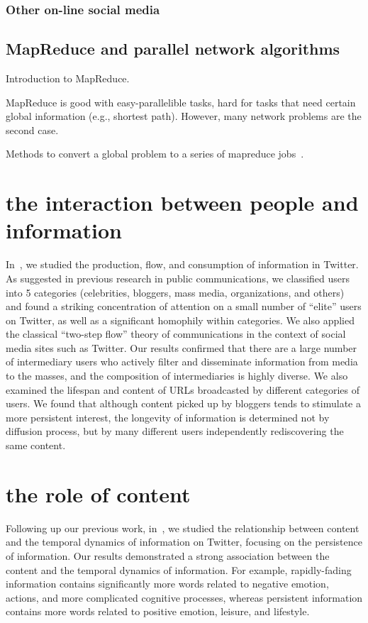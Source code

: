 \documentclass[phd,tocprelim]{cornell}
\begin{document}
\subsection{Other on-line social media}


\section{MapReduce and parallel network algorithms}
Introduction to MapReduce.

MapReduce is good with easy-parallelible tasks, hard for tasks that need certain global information (e.g., shortest path). However, many network problems are the second case. 

Methods to convert a global problem to a series of mapreduce jobs~\cite{Suri-Triangle-2011}.




\chapter{the interaction between people and information}

In~\cite{Wu-Twitter-2011}, we studied the production, flow, and consumption of information in Twitter. As suggested in previous research in public communications, we classified users into 5 categories (celebrities, bloggers, mass media, organizations, and others) and found a striking concentration of attention on a small number of ``elite'' users on Twitter, as well as a significant homophily within categories. We also applied the classical ``two-step flow'' theory of communications in the context of social media sites such as Twitter. Our results confirmed that there are a large number of intermediary users who actively filter and disseminate information from media to the masses, and the composition of intermediaries is highly diverse. We also examined the lifespan and content of URLs broadcasted by different categories of users. We found that although content picked up by bloggers tends to stimulate a more persistent interest, the longevity of information is determined not by diffusion process, but by many different users independently rediscovering the same content.




\chapter{the role of content}
Following up our previous work, in~\cite{Wu-ICWSM-2011}, we studied the relationship between content and the temporal dynamics of information on Twitter, focusing on the persistence of information. Our results demonstrated a strong association between the content and the temporal dynamics of information. For example, rapidly-fading information contains significantly more words related to negative emotion, actions, and more complicated cognitive processes, whereas persistent information contains more words related to positive emotion, leisure, and lifestyle.
\end{document}
